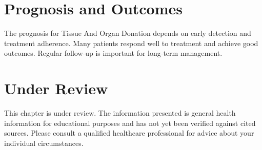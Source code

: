 \section*{Prognosis and Outcomes}
The prognosis for Tissue And Organ Donation depends on early detection and treatment adherence. Many patients respond well to treatment and achieve good outcomes. Regular follow-up is important for long-term management.
\section*{Under Review}
This chapter is under review. The information presented is general health information for educational purposes and has not yet been verified against cited sources. Please consult a qualified healthcare professional for advice about your individual circumstances.


\clearpage
